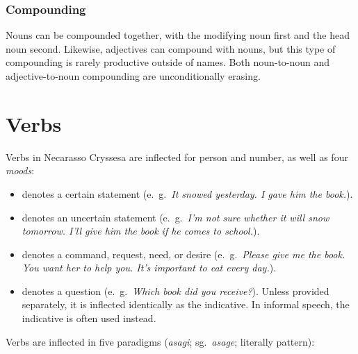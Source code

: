\documentclass{book}
\begin{document}
\subsection{Compounding}

Nouns can be compounded together, with the modifying noun first and the head noun second. Likewise, adjectives can compound with nouns, but this type of compounding is rarely productive outside of names. Both noun-to-noun and adjective-to-noun compounding are unconditionally erasing.

\chapter{Verbs}

Verbs in Necarasso Cryssesa are inflected for person and number, as well as four \emph{moods}:


\begin{itemize}
  \item {} denotes a certain statement (e.~g.~\emph{It snowed yesterday. I gave him the book.}).
  \item {} denotes an uncertain statement (e.~g.~\emph{I'm not sure whether it will snow tomorrow. I'll give him the book if he \emph{comes to school}.}).
  \item {} denotes a command, request, need, or desire (e.~g.~\emph{Please give me the book. You want her to help you. It's important to eat every day.}).
  \item {} denotes a question (e.~g.~\emph{Which book did you receive?}). Unless provided separately, it is inflected identically as the indicative. In informal speech, the indicative is often used instead.
\end{itemize}

Verbs are inflected in five paradigms (\emph{asagi}; sg.~\emph{asage}; literally pattern): \\
\end{document}
